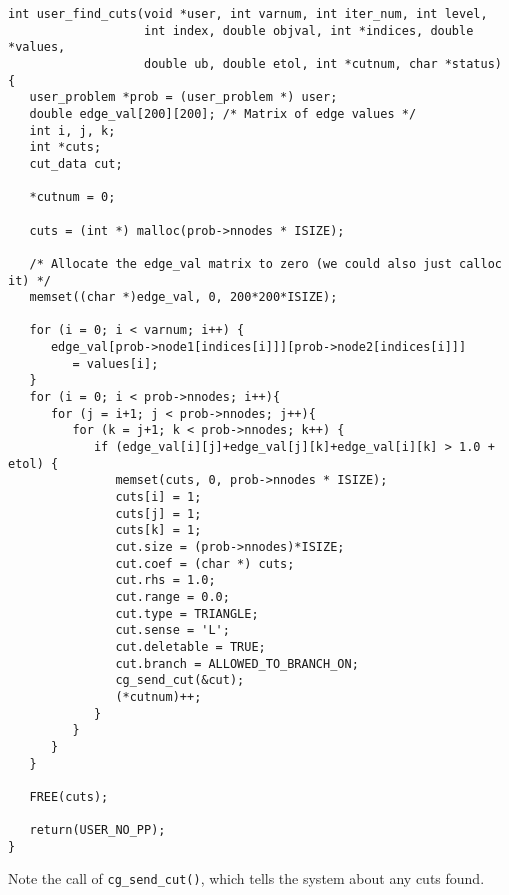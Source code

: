 \documentclass[11pt]{article}
\begin{document}
\begin{verbatim}
int user_find_cuts(void *user, int varnum, int iter_num, int level,
                   int index, double objval, int *indices, double *values,
                   double ub, double etol, int *cutnum, char *status)
{
   user_problem *prob = (user_problem *) user;
   double edge_val[200][200]; /* Matrix of edge values */
   int i, j, k;
   int *cuts;
   cut_data cut;
   
   *cutnum = 0;

   cuts = (int *) malloc(prob->nnodes * ISIZE);

   /* Allocate the edge_val matrix to zero (we could also just calloc it) */
   memset((char *)edge_val, 0, 200*200*ISIZE);
   
   for (i = 0; i < varnum; i++) {
      edge_val[prob->node1[indices[i]]][prob->node2[indices[i]]] 
         = values[i];
   }
   for (i = 0; i < prob->nnodes; i++){
      for (j = i+1; j < prob->nnodes; j++){
         for (k = j+1; k < prob->nnodes; k++) {
            if (edge_val[i][j]+edge_val[j][k]+edge_val[i][k] > 1.0 + etol) {
               memset(cuts, 0, prob->nnodes * ISIZE);
               cuts[i] = 1; 
               cuts[j] = 1;
               cuts[k] = 1;
               cut.size = (prob->nnodes)*ISIZE;
               cut.coef = (char *) cuts;
               cut.rhs = 1.0;
               cut.range = 0.0;
               cut.type = TRIANGLE;
               cut.sense = 'L';
               cut.deletable = TRUE;
               cut.branch = ALLOWED_TO_BRANCH_ON;
               cg_send_cut(&cut);
               (*cutnum)++;
            }
         }
      }
   }
   
   FREE(cuts);

   return(USER_NO_PP);
}
\end{verbatim}

Note the call of \texttt{cg\_send\_cut()}, which tells the system about any
cuts found.
\end{document}
